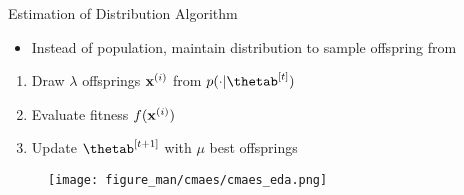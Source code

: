 \documentclass[11pt,compress,t,notes=noshow, xcolor=table]{beamer}
\begin{document}
%
%
%
%
%
%
\begin{frame}{Estimation of Distribution Algorithm}

\begin{minipage}{0.62\textwidth}
\begin{itemize}
    \item Instead of population, maintain distribution to sample offspring from
\end{itemize}

\vspace{\baselineskip}

\begin{enumerate}
    \item Draw $\lambda$ offsprings $\mathbf{x}^{(i)}$ from $p(\cdot|\thetab^{[t]})$
    \item Evaluate fitness $f(\mathbf{x}^{(i)})$ 
    \item Update $\thetab^{[t+1]}$ with $\mu$ best offsprings
\end{enumerate}

\end{minipage}\hfill
\begin{minipage}{0.35\textwidth}\raggedleft
\begin{figure}
  \texttt{[image: figure\_man/cmaes/cmaes\_eda.png]}
\end{figure}
\end{minipage}

\end{frame}
\end{document}

